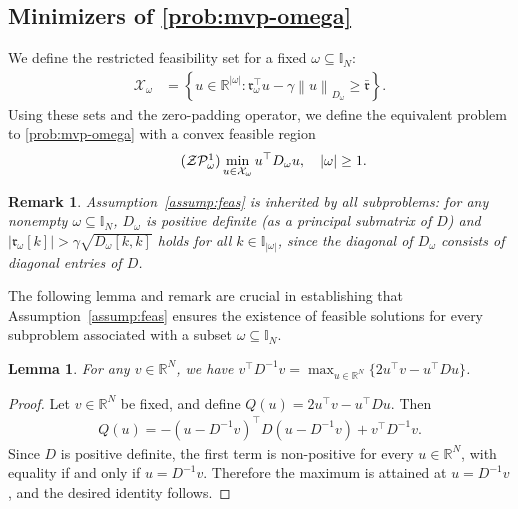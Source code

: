 \documentclass[11pt]{article}
\theoremstyle{plain}
\newtheorem{lemma}{Lemma}
\theoremstyle{definition}
\theoremstyle{plain}
\newtheorem{remark}{Remark}
\newcommand{\RR}{{\mathbb R}} %
\newcommand{\II}{{\mathbb I}}
\newcommand{\norm}[1]{\left\lVert#1\right\rVert}
\newcommand{\abs}[1]{\left\lvert#1\right\rvert}
\newcommand{\tpose}[1]{#1^{\top}}
\newcommand{\cP}{{\mathcal P}}
\newcommand{\ccr}{{\mathfrak r}}
\newcommand{\cX}{{\mathcal X}}
\newcommand{\cZ}{{\mathcal Z}}
\begin{document}
\subsection{Minimizers of \texorpdfstring{\eqref{prob:mvp-omega}}{P1w}}
We define the restricted feasibility set for a fixed $\omega\subseteq\II_N$:
\begin{align*}
	\cX_\omega&=\left\{u\in\RR^{\abs{\omega}}:\tpose{\ccr_\omega}u-\gamma \norm{u}_{D_\omega}\geq \bar{\ccr}\right\}.
\end{align*}
Using these sets and the zero-padding operator, we define the equivalent problem to \eqref{prob:mvp-omega} with a convex feasible region
\begin{align}\tag{$\cZ\cP^1_\omega$}\label{prob:zpmvp}
	\min_{u\in \cX_\omega}\tpose{u}D_\omega u, \quad \abs{\omega}\geq 1.
\end{align}
\begin{remark}\label{rem:stillposdiag}
Assumption~\ref{assump:feas} is inherited by all subproblems: for any nonempty $\omega\subseteq\II_N$, $D_\omega$ is positive definite (as a principal submatrix of $D$) and $|\ccr_\omega[k]|>\gamma \sqrt{D_\omega[k,k]}$ holds for all $k\in\II_{\abs{\omega}}$, since the diagonal of $D_\omega$ consists of diagonal entries of $D$.
\end{remark}
The following lemma and remark are crucial in establishing that Assumption~\ref{assump:feas} ensures the existence of feasible solutions for every subproblem associated with a subset $\omega \subseteq \II_N$.
\begin{lemma}\label{lem:Fenchel}
    For any $v\in \RR^N$, we have $\tpose{v}D^{-1}v=\max_{u\in\RR^N}\{2\tpose{u}v-\tpose{u}Du\}$.
\end{lemma}
\begin{proof}Let $v\in\RR^N$ be fixed, and define $Q(u)=2\tpose{u}v-\tpose{u}Du$. Then
\begin{align*}
    Q(u)=-\tpose{(u-D^{-1}v)} D (u-D^{-1}v) + \tpose{v}D^{-1}v.
\end{align*}
Since $D$ is positive definite, the first term is non-positive for every $u\in\RR^N$, with equality if and only if $u=D^{-1}v$. Therefore the maximum is attained at $u=D^{-1}v$, and the desired identity follows.
\end{proof}
\end{document}
